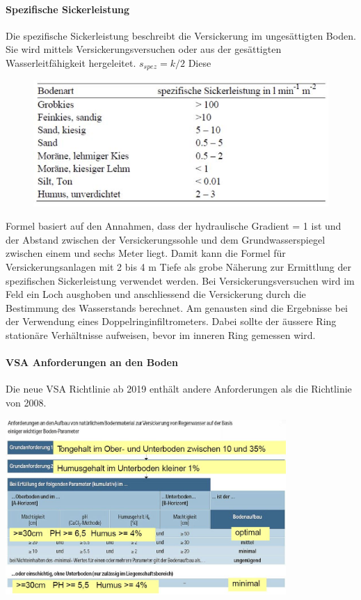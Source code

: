 \documentclass[9pt, openright=false]{scrartcl}
\begin{document}
\paragraph{Spezifische Sickerleistung} Die spezifische Sickerleistung beschreibt die Versickerung im ungesättigten Boden. Sie wird mittels Versickerungsversuchen oder aus der gesättigten Wasserleitfähigkeit hergeleitet. $s_{spez} = k/2$ Diese\begin{figure} 
  \includegraphics[width=.55\textwidth]{images/spezsicker}
\end{figure} Formel basiert auf den Annahmen, dass der hydraulische Gradient = 1 ist und der Abstand zwischen der Versickerungssohle und dem Grundwasserspiegel zwischen einem und sechs Meter liegt. Damit kann die Formel für Versickerungsanlagen mit 2 bis 4 m Tiefe als grobe Näherung zur Ermittlung der spezifischen Sickerleistung verwendet werden. Bei Versickerungsversuchen wird im Feld ein Loch ausghoben und anschliessend die Versickerung durch die Bestimmung des Wasserstands berechnet. Am genausten sind die Ergebnisse bei der Verwendung eines Doppelringinfiltrometers.  Dabei sollte der äussere Ring stationäre Verhältnisse aufweisen, bevor im inneren Ring gemessen wird.\clearpage
\paragraph{VSA Anforderungen an den Boden} Die neue VSA Richtlinie ab 2019 enthält andere Anforderungen als die Richtlinie von 2008. 
\begin{center}
\includegraphics[width=0.8\textwidth]{images/vsaboden}
\end{center}
\end{document}
